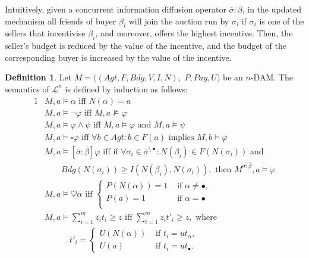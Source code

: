 \documentclass[letterpaper]{article} %
\theoremstyle{definition}
\newtheorem{definition}{Definition}
\newcommand{\Pay}{\mathit{Pay}}
\begin{document}
Intuitively, given a concurrent information diffusion operator $\overline{\sigma}: \overline{\beta}$, in the updated mechanism all friends of buyer $\beta_i$ will join the auction run by $\sigma_i$ if $\sigma_i$ is one of the sellers that incentivise $\beta_i$, and moreover, offers the highest incentive. Then, the seller's budget is reduced by the value of the incentive, and the budget of the corresponding buyer is increased by the value of the incentive.    

\begin{definition}
Let $M = ((Agt, F, Bdg, V, I, N),$ $P, \Pay, U)$ be an $n$-DAM. The semantics of $\mathcal{L}^n$  is defined by induction as follows: 
    \begin{alignat*}{1}
        &M, a \models \alpha  \text{ iff }  N(\alpha) = a\\
        &M, a \models \lnot \varphi  \text{ iff }  M, a \not \models \varphi\\
        &M, a \models\varphi \land \psi  \text{ iff }  M, a \models \varphi \text{ and } M, a \models \psi\\
        &M, a \models \square \varphi  \text{ iff }  \forall b \in Agt: b \in F(a) \text{ implies } M, b \models \varphi\\
&M, a \models [\overline{\sigma}:\overline{\beta}] \varphi  \text{ iff }  \text{if }  \forall \sigma_i \in \overline{\sigma}^{\setminus \bullet}: %
        N(\beta_i) \in F(N(\sigma_i)) \text{ and }\\ 
        &\quad \quad Bdg(N(\sigma_i)) \geqslant I(N(\beta_i),N(\sigma_i)), \text{ then } M^{\overline{\sigma}:\overline{\beta}},a \models \varphi\\
        &M,a \models \heartsuit \alpha  \text{ iff }  
        \begin{cases}
        P(N(\alpha)) = 1 &\text{ if } \alpha \neq \bullet,\\
        P(a) = 1 &\text{ if } \alpha = \bullet\\
        \end{cases}\\
        &M,a \models \sum_{i = 1}^m z_i t_i  \geqslant z  \text{ iff }  \sum_{i = 1}^m z_i t'_i \geqslant z, \text{ where } \\
        &\qquad \quad t'_i =
    \begin{cases}
        U(N(\alpha)) &\text{ if } t_i = ut_\alpha,\\
         U(a) &\text{ if } t_i = ut_{\bullet}.
    \end{cases}
\end{alignat*}     


\end{definition}
\end{document}
